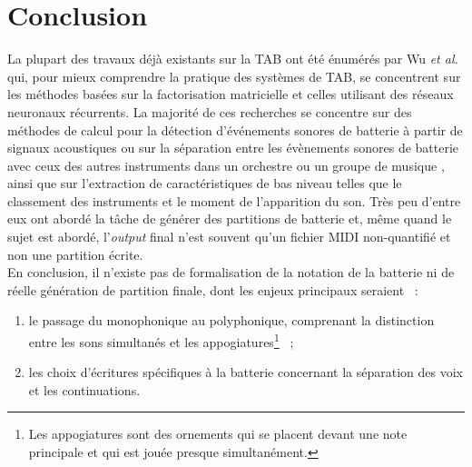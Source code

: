 \section*{Conclusion}
La plupart des travaux déjà existants sur la TAB ont été énumérés par Wu
\textit{et al.} \cite{Review_ADT} qui, pour mieux comprendre la pratique des
systèmes de TAB, se concentrent sur les méthodes basées sur la factorisation
matricielle et celles utilisant des réseaux neuronaux récurrents. La majorité
de ces recherches se concentre sur des méthodes de calcul pour la détection
d’événements sonores de batterie à partir de signaux acoustiques ou sur la
séparation entre les évènements sonores de batterie avec ceux des autres
instruments dans un orchestre ou un groupe de musique \cite{2802}, ainsi que
sur l’extraction de caractéristiques de bas niveau telles que le classement des
instruments et le moment de l’apparition du son. Très peu d’entre eux ont
abordé la tâche de générer des partitions de batterie et, même quand le sujet
est abordé, l’\textit{output} final n’est souvent qu’un fichier MIDI
non-quantifié et non une partition écrite.\\

En conclusion, il n’existe pas de formalisation de la notation de la batterie
ni de réelle génération de partition finale, dont les enjeux principaux
seraient~ :
\begin{enumerate}
    \item le passage du monophonique au polyphonique, comprenant la distinction
        entre les sons simultanés et les appogiatures\footnote{Les appogiatures
        sont des ornements qui se placent devant une note principale et qui est
    jouée presque simultanément.}~ ;
    \item les choix d’écritures spécifiques à la batterie concernant la
        séparation des voix et les continuations.
\end{enumerate}
